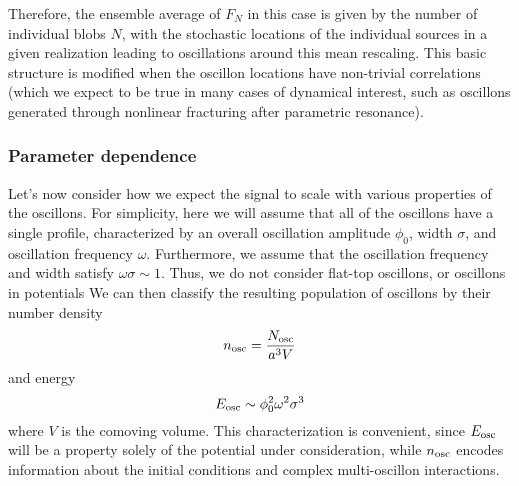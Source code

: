 \documentclass{revtex4}
\begin{document}
Therefore, the ensemble average of $F_N$ in this case is given by the number of individual blobs $N$, with the stochastic locations of the individual sources in a given realization leading to oscillations around this mean rescaling.
This basic structure is modified when the oscillon locations have non-trivial correlations (which we expect to be true in many cases of dynamical interest, such as oscillons generated through nonlinear fracturing after parametric resonance).


\subsubsection{Parameter dependence}
Let's now consider how we expect the signal to scale with various properties of the oscillons.
For simplicity, here we will assume that all of the oscillons have a single profile, characterized by an overall oscillation amplitude $\phi_0$, width $\sigma$, and oscillation frequency $\omega$.
Furthermore, we assume that the oscillation frequency and width satisfy $\omega\sigma \sim 1$.
Thus, we do not consider flat-top oscillons, or oscillons in potentials
We can then classify the resulting population of oscillons by their number density
\begin{equation}
  n_{\rm osc} = \frac{N_{\rm osc}}{a^3V}
\end{equation}
and energy
\begin{equation}
  E_{\rm osc} \sim \phi_0^2\omega^2\sigma^3
\end{equation}
where $V$ is the comoving volume.
This characterization is convenient, since $E_{\rm osc}$ will be a property solely of the potential under consideration, while $n_{\rm osc}$ encodes information about the initial conditions and complex multi-oscillon interactions.
\end{document}
